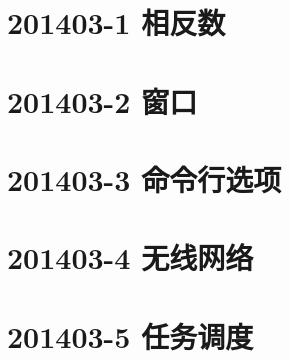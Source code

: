 \documentclass[cn,10pt,math=newtx,citestyle=gb7714-2015,bibstyle=gb7714-2015]{elegantbook}
\newif\ifonlyanalyze %
\begin{document}
\newpage
\section{201403-1 相反数}
\ifonlyanalyze
\else
    
\fi


\newpage
\section{201403-2 窗口}
\ifonlyanalyze
\else
    
\fi


\newpage
\section{201403-3 命令行选项}
\ifonlyanalyze
\else
    
\fi


\newpage
\section{201403-4 无线网络}
\ifonlyanalyze
\else
    
\fi


\newpage
\section{201403-5 任务调度}
\ifonlyanalyze
\else
    
\fi


\appendix

\ifonlyanalyze
\else
    
\fi
\end{document}
